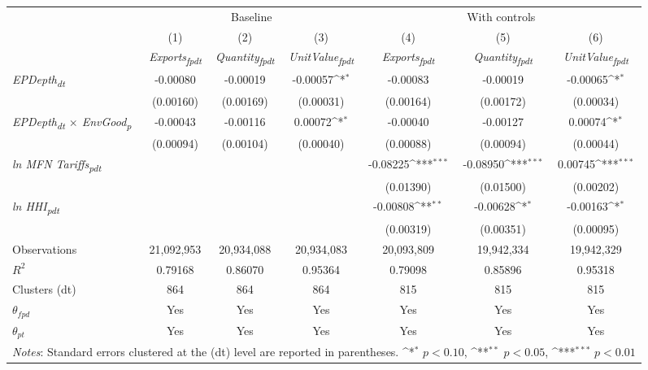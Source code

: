 {
\def\sym#1{\ifmmode^{#1}\else\(^{#1}\)\fi}
\begin{tabular}{l*{6}{c}}
\toprule
&\multicolumn{3}{c}{Baseline}&\multicolumn{3}{c}{With controls}\\\cmidrule(lr){2-4}\cmidrule(lr){5-7}
&(1)&(2)&(3)&(4)&(5)&(6)\\
&\textit{Exports\textsubscript{fpdt}}&\textit{Quantity\textsubscript{fpdt}}&\textit{UnitValue\textsubscript{fpdt}}&\textit{Exports\textsubscript{fpdt}}&\textit{Quantity\textsubscript{fpdt}}&\textit{UnitValue\textsubscript{fpdt}}\\
\midrule
\textit{EPDepth\textsubscript{dt}} & -0.00080 & -0.00019 & -0.00057\sym{*} & -0.00083 & -0.00019 & -0.00065\sym{*}\\
 & (0.00160) & (0.00169) & (0.00031) & (0.00164) & (0.00172) & (0.00034)\\
\addlinespace
\textit{EPDepth\textsubscript{dt} $\times$ EnvGood\textsubscript{p}} & -0.00043 & -0.00116 & 0.00072\sym{*} & -0.00040 & -0.00127 & 0.00074\sym{*}\\
 & (0.00094) & (0.00104) & (0.00040) & (0.00088) & (0.00094) & (0.00044)\\
\addlinespace
\textit{ln MFN Tariffs\textsubscript{pdt}} &  &  &  & -0.08225\sym{***} & -0.08950\sym{***} & 0.00745\sym{***}\\
 &  &  &  & (0.01390) & (0.01500) & (0.00202)\\
\addlinespace
\textit{ln HHI\textsubscript{pdt}} &  &  &  & -0.00808\sym{**} & -0.00628\sym{*} & -0.00163\sym{*}\\
 &  &  &  & (0.00319) & (0.00351) & (0.00095)\\
\midrule
Observations & 21,092,953 & 20,934,088 & 20,934,083 & 20,093,809 & 19,942,334 & 19,942,329\\
$R^{2}$ & 0.79168 & 0.86070 & 0.95364 & 0.79098 & 0.85896 & 0.95318\\
Clusters (dt) & 864 & 864 & 864 & 815 & 815 & 815\\
$\theta_{fpd}$ & Yes & Yes & Yes & Yes & Yes & Yes\\
$\theta_{pt}$ & Yes & Yes & Yes & Yes & Yes & Yes\\
\bottomrule
\multicolumn{7}{l}{\footnotesize \textit{Notes}: Standard errors clustered at the (dt) level are reported in parentheses. \sym{*} \(p<0.10\), \sym{**} \(p<0.05\), \sym{***} \(p<0.01\)}\\
\end{tabular}
}
